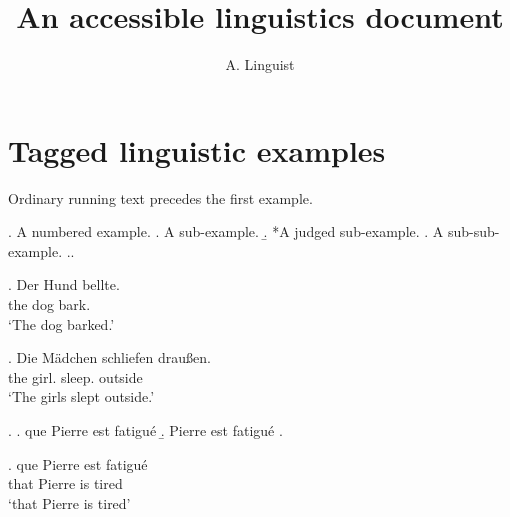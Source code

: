\documentclass{article}
\title{An accessible linguistics document}
\author{A. Linguist}
\begin{document}
\maketitle

\section{Tagged linguistic examples}
Ordinary running text precedes the first example.

\ex.\label{intro} A numbered example.
\a. A sub-example.
\b. *A judged sub-example.
\a. A sub-sub-example.
\z.\z.

\exg. Der Hund bellte.\\ the dog bark.\\
\glt `The dog barked.'

\exg. Die Mädchen schliefen draußen.\\
      the girl. sleep. outside\\
\glt `The girls slept outside.'

{\setlength{\ExAnnotColumn}{9cm}
\ex.
\a. que Pierre est fatigué\exannot{[CP]}
\b. Pierre est fatigué\exannot{[TP]}
\z.

\exg. que Pierre est fatigué \exannot{[CP]}\\
      that Pierre is tired\\
\glt `that Pierre is tired'}
\end{document}
